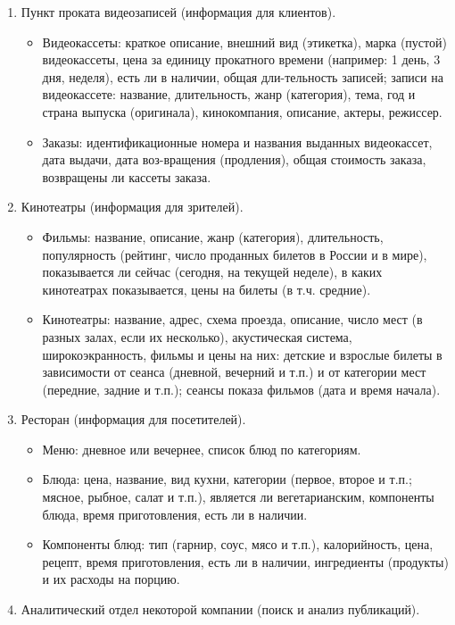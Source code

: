 \documentclass[12pt, openany, twoside]{book} %
\begin{document}
\begin{enumerate}
\begin{itemize}
\end{itemize}
\item Пункт проката видеозаписей (информация для клиентов).
\begin{itemize}
\item Видеокассеты: краткое описание, внешний вид (этикетка), марка (пустой) видеокассеты, цена за единицу прокатного времени (например: 1 день, 3 дня, неделя), есть ли в наличии, общая дли-тельность записей; записи на видеокассете: название, длительность, жанр (категория), тема, год и страна выпуска (оригинала), кинокомпания, описание, актеры, режиссер.
\item Заказы: идентификационные номера и названия выданных видеокассет, дата выдачи, дата воз-вращения (продления), общая стоимость заказа, возвращены ли кассеты заказа.
\end{itemize}
\item Кинотеатры (информация для зрителей).
\begin{itemize}
\item Фильмы: название, описание, жанр (категория), длительность, популярность (рейтинг, число проданных билетов в России и в мире), показывается ли сейчас (сегодня, на текущей неделе), в каких кинотеатрах показывается, цены на билеты (в т.ч. средние).
\item Кинотеатры: название, адрес, схема проезда, описание, число мест (в разных залах, если их несколько), акустическая система, широкоэкранность, фильмы и цены на них: детские и взрослые билеты в зависимости от сеанса (дневной, вечерний и т.п.) и от категории мест (передние, задние и т.п.); сеансы показа фильмов (дата и время начала).
\end{itemize}
\item Ресторан (информация для посетителей).
\begin{itemize}
\item Меню: дневное или вечернее, список блюд по категориям.
\item Блюда: цена, название, вид кухни, категории (первое, второе и т.п.; мясное, рыбное, салат и т.п.), является ли вегетарианским, компоненты блюда, время приготовления, есть ли в наличии.
\item Компоненты блюд: тип (гарнир, соус, мясо и т.п.), калорийность, цена, рецепт, время приготовления, есть ли в наличии, ингредиенты (продукты) и их расходы на порцию.
\end{itemize}
\item Аналитический отдел некоторой компании (поиск и анализ публикаций).
\begin{itemize}

\end{itemize}
\end{enumerate}
\end{document}
